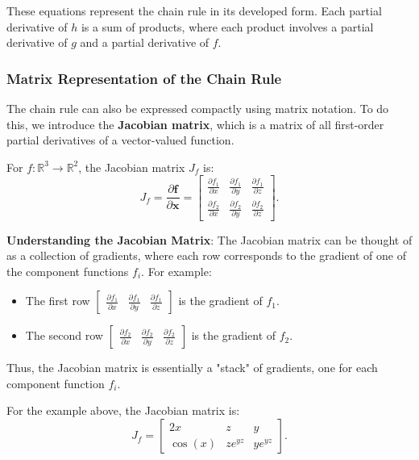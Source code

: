 \begin{notechapter}
These equations represent the chain rule in its developed form. Each partial derivative of \( h \) is a sum of products, where each product involves a partial derivative of \( g \) and a partial derivative of \( f \).

\subsubsection{Matrix Representation of the Chain Rule}
The chain rule can also be expressed compactly using matrix notation. To do this, we introduce the \textbf{Jacobian matrix}, which is a matrix of all first-order partial derivatives of a vector-valued function.

For \( f: \mathbb{R}^3 \rightarrow \mathbb{R}^2 \), the Jacobian matrix \( J_f \) is:
\[
J_f = \frac{\partial \mathbf{f}}{\partial \mathbf{x}} = \begin{bmatrix}
\frac{\partial f_1}{\partial x} & \frac{\partial f_1}{\partial y} & \frac{\partial f_1}{\partial z} \\
\frac{\partial f_2}{\partial x} & \frac{\partial f_2}{\partial y} & \frac{\partial f_2}{\partial z}
\end{bmatrix}.
\]

\textbf{Understanding the Jacobian Matrix}:
The Jacobian matrix can be thought of as a collection of gradients, where each row corresponds to the gradient of one of the component functions \( f_i \). For example:
\begin{itemize}
    \item The first row \( \begin{bmatrix} \frac{\partial f_1}{\partial x} & \frac{\partial f_1}{\partial y} & \frac{\partial f_1}{\partial z} \end{bmatrix} \) is the gradient of \( f_1 \).
    \item The second row \( \begin{bmatrix} \frac{\partial f_2}{\partial x} & \frac{\partial f_2}{\partial y} & \frac{\partial f_2}{\partial z} \end{bmatrix} \) is the gradient of \( f_2 \).
\end{itemize}

Thus, the Jacobian matrix is essentially a "stack" of gradients, one for each component function \( f_i \).

For the example above, the Jacobian matrix is:
\[
J_f = \begin{bmatrix}
2x & z & y \\
\cos(x) & z e^{yz} & y e^{yz}
\end{bmatrix}.
\]


\end{notechapter}
